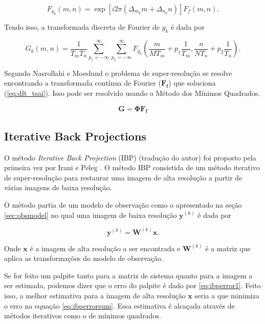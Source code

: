 \begin{equation}
	F_{g_k} (m,n) = \exp{[i2\pi (\Delta_{m_k}m + \Delta_{n_k}n)]} F_f (m,n).
\end{equation}

Tendo isso, a transformada discreta de Fourier de $g_k$ é dada por

\begin{equation}
	G_k(m,n) = \frac{1}{T_m T_n} \sum^\infty_{p_1=-\infty} \sum^\infty_{p_2=-\infty}
	F_{g_k} \left( \frac{m}{MT_m} + p_1 \frac{1}{T_m},
	\frac{n}{NT_n} + p_2\frac{1}{T_n} \right).
\end{equation}

Segundo Nasrollahi e Moeslund \cite{nasrollahi2014super} o problema de super-resolução se resolve encontrando a transformada contínua de Fourier ($\mathbf{F_f}$) que soluciona (\ref{eq:dft_tsai}).
Isso pode ser resolvido usando o Método dos Mínimos Quadrados.

\begin{equation}
	\label{eq:dft_tsai}
	\mathbf{G} = \mathbf{\Phi F_f}
\end{equation}





\subsection{Iterative Back Projections}
O método \emph{Iterative Back Projection} (IBP) (tradução do autor) foi proposto pela primeira vez por Irani e Peleg \cite{irani1991improv}.
O método IBP consistida de um método iterativo de super-resolução para restaurar uma imagem de alta resolução a partir de várias imagens de baixa resolução.

O método partia de um modelo de observação como o apresentado na seção \ref{sec:obsmodel} no qual uma imagem de baixa resolução $\mathbf{y}^{(k)}$ é dada por

\begin{equation}
	\mathbf{y}^{(k)} = \mathbf{W}^{(k)} \mathbf{x}.
\end{equation}

Onde $\mathbf{x}$ é a imagem de alta resolução a ser encontrada e $\mathbf{W}^{(k)}$ é a matriz que aplica as transformações do modelo de observação.

Se for feito um palpite tanto para a matriz de sistema quanto para a imagem a ser estimada, podemos dizer que o erro do palpite é dado por \ref{eq:ibperror1}.
Feito isso, a melhor estimativa para a imagem de alta resolução $\mathbf{x}$ seria a que minimiza o erro na equação \ref{eq:ibperrorsum}.
Essa estimativa é alcaçada através de métodos iterativos como o de mínimos quadrados.

